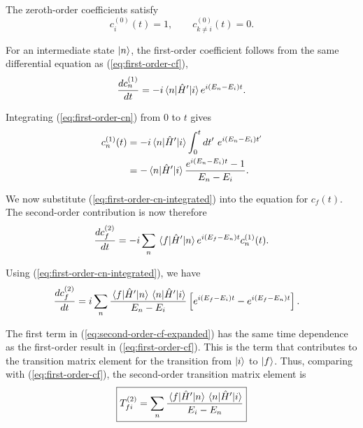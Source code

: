 \documentclass[12pt,a4paper]{article}
\begin{document}
\begin{solution_pset}
		The zeroth-order coefficients satisfy
		\begin{equation}
			c_i^{(0)}(t)=1,
			\qquad
			c_{k\neq i}^{(0)}(t)=0.
			\label{eq:zeroth-order}
		\end{equation}

		For an intermediate state $\ket{n}$, the first-order coefficient follows
		from the same differential equation as (\ref{eq:first-order-cf}),
		\begin{equation}
			\dv{c_n^{(1)}}{t}
			=
			-i\matrixel{n}{\hat H'}{i}
			e^{i(E_n-E_i)t}.
			\label{eq:first-order-cn}
		\end{equation}

		Integrating (\ref{eq:first-order-cn}) from $0$ to $t$ gives
		\begin{equation}
			\begin{aligned}
			c_n^{(1)}(t)
			&=
			-i\matrixel{n}{\hat H'}{i}
			\int_0^t
			\dd{t'}\,e^{i(E_n-E_i)t'}
			\\
			&=
			-\matrixel{n}{\hat H'}{i}
			\frac{e^{i(E_n-E_i)t}-1}{E_n-E_i}.
			\end{aligned}
			\label{eq:first-order-cn-integrated}
		\end{equation}

		We now substitute (\ref{eq:first-order-cn-integrated}) into the equation for
		$c_f(t)$. The second-order contribution is now therefore
		\begin{equation}
			\dv{c_f^{(2)}}{t}
			=
			-i\sum_n
			\matrixel{f}{\hat H'}{n}
			e^{i(E_f-E_n)t}
			c_n^{(1)}(t).
			\label{eq:second-order-cf}
		\end{equation}

		Using (\ref{eq:first-order-cn-integrated}), we have
		\begin{equation}
			\begin{aligned}
			\dv{c_f^{(2)}}{t}
			&=
			i\sum_n
			\frac{
				\matrixel{f}{\hat H'}{n}
				\matrixel{n}{\hat H'}{i}
			}{
				E_n-E_i
			}
			\left[
				e^{i(E_f-E_i)t}
				-
				e^{i(E_f-E_n)t}
			\right].
			\end{aligned}
			\label{eq:second-order-cf-expanded}
		\end{equation}

		The first term in (\ref{eq:second-order-cf-expanded}) has the same time
		dependence as the first-order result in (\ref{eq:first-order-cf}). This is the
		term that contributes to the transition matrix element for the transition
		from $\ket{i}$ to $\ket{f}$. Thus, comparing with (\ref{eq:first-order-cf}),
		the second-order transition matrix element is
		\begin{equation}
			\boxed{
				T_{fi}^{(2)}
				=
				\sum_n
				\frac{
					\matrixel{f}{\hat H'}{n}
					\matrixel{n}{\hat H'}{i}
				}{
					E_i-E_n
				}
			}
			\label{eq:Tfi-second}
		\end{equation}


\end{solution_pset}
\end{document}

